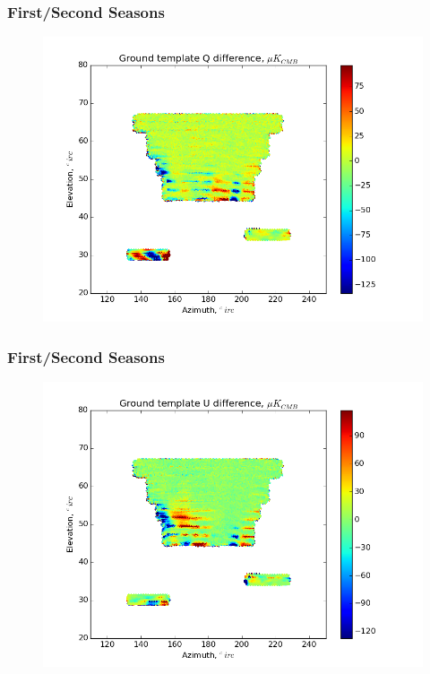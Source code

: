 \documentclass{beamer}
\begin{document}
\begin{frame}
\frametitle{First/Second Seasons}
\begin{figure}
\includegraphics[width=0.9\linewidth]{dQ_gt_FIRST_SECOND.png}
\end{figure}
\end{frame}

\begin{frame}
\frametitle{First/Second Seasons}
\begin{figure}
\includegraphics[width=0.9\linewidth]{dU_gt_FIRST_SECOND.png}
\end{figure}
\end{frame}
\end{document}
